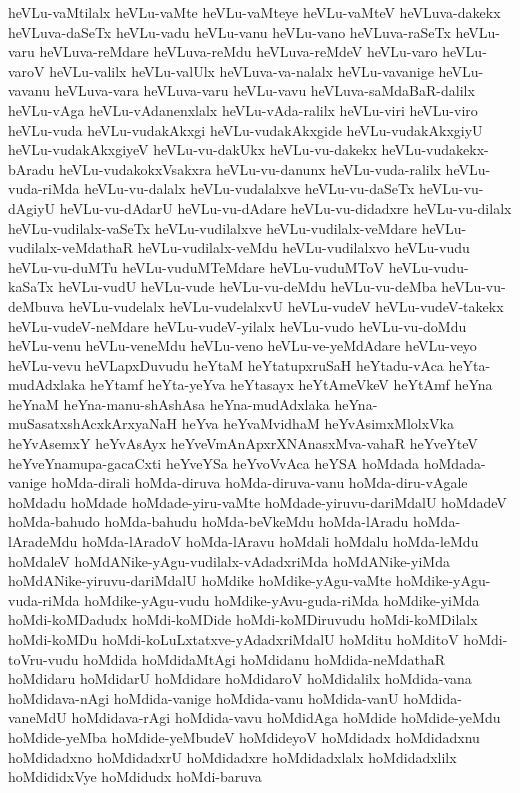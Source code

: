 {heVLu-vaMtilalx
heVLu-vaMte
heVLu-vaMteye
heVLu-vaMteV
heVLuva-dakekx
heVLuva-daSeTx
heVLu-vadu
heVLu-vanu
heVLu-vano
heVLuva-raSeTx
heVLu-varu
heVLuva-reMdare
heVLuva-reMdu
heVLuva-reMdeV
heVLu-varo
heVLu-varoV
heVLu-valilx
heVLu-valUlx
heVLuva-va-nalalx
heVLu-vavanige
heVLu-vavanu
heVLuva-vara
heVLuva-varu
heVLu-vavu
heVLuva-saMdaBaR-dalilx
heVLu-vAga
heVLu-vAdanenxlalx
heVLu-vAda-ralilx
heVLu-viri
heVLu-viro
heVLu-vuda
heVLu-vudakAkxgi
heVLu-vudakAkxgide
heVLu-vudakAkxgiyU
heVLu-vudakAkxgiyeV
heVLu-vu-dakUkx
heVLu-vu-dakekx
heVLu-vudakekx-bAradu
heVLu-vudakokxVsakxra
heVLu-vu-danunx
heVLu-vuda-ralilx
heVLu-vuda-riMda
heVLu-vu-dalalx
heVLu-vudalalxve
heVLu-vu-daSeTx
heVLu-vu-dAgiyU
heVLu-vu-dAdarU
heVLu-vu-dAdare
heVLu-vu-didadxre
heVLu-vu-dilalx
heVLu-vudilalx-vaSeTx
heVLu-vudilalxve
heVLu-vudilalx-veMdare
heVLu-vudilalx-veMdathaR
heVLu-vudilalx-veMdu
heVLu-vudilalxvo
heVLu-vudu
heVLu-vu-duMTu
heVLu-vuduMTeMdare
heVLu-vuduMToV
heVLu-vudu-kaSaTx
heVLu-vudU
heVLu-vude
heVLu-vu-deMdu
heVLu-vu-deMba
heVLu-vu-deMbuva
heVLu-vudelalx
heVLu-vudelalxvU
heVLu-vudeV
heVLu-vudeV-takekx
heVLu-vudeV-neMdare
heVLu-vudeV-yilalx
heVLu-vudo
heVLu-vu-doMdu
heVLu-venu
heVLu-veneMdu
heVLu-veno
heVLu-ve-yeMdAdare
heVLu-veyo
heVLu-vevu
heVLapxDuvudu
heYtaM
heYtatupxruSaH
heYtadu-vAca
heYta-mudAdxlaka
heYtamf
heYta-yeYva
heYtasayx
heYtAmeVkeV
heYtAmf
heYna
heYnaM
heYna-manu-shAshAsa
heYna-mudAdxlaka
heYna-muSasatxshAcxkArxyaNaH
heYva
heYvaMvidhaM
heYvAsimxMlolxVka
heYvAsemxY
heYvAsAyx
heYveVmAnApxrXNAnasxMva-vahaR
heYveYteV
heYveYnamupa-gacaCxti
heYveYSa
heYvoVvAca
heYSA
hoMdada
hoMdada-vanige
hoMda-dirali
hoMda-diruva
hoMda-diruva-vanu
hoMda-diru-vAgale
hoMdadu
hoMdade
hoMdade-yiru-vaMte
hoMdade-yiruvu-dariMdalU
hoMdadeV
hoMda-bahudo
hoMda-bahudu
hoMda-beVkeMdu
hoMda-lAradu
hoMda-lAradeMdu
hoMda-lAradoV
hoMda-lAravu
hoMdali
hoMdalu
hoMda-leMdu
hoMdaleV
hoMdANike-yAgu-vudilalx-vAdadxriMda
hoMdANike-yiMda
hoMdANike-yiruvu-dariMdalU
hoMdike
hoMdike-yAgu-vaMte
hoMdike-yAgu-vuda-riMda
hoMdike-yAgu-vudu
hoMdike-yAvu-guda-riMda
hoMdike-yiMda
hoMdi-koMDadudx
hoMdi-koMDide
hoMdi-koMDiruvudu
hoMdi-koMDilalx
hoMdi-koMDu
hoMdi-koLuLxtatxve-yAdadxriMdalU
hoMditu
hoMditoV
hoMdi-toVru-vudu
hoMdida
hoMdidaMtAgi
hoMdidanu
hoMdida-neMdathaR
hoMdidaru
hoMdidarU
hoMdidare
hoMdidaroV
hoMdidalilx
hoMdida-vana
hoMdidava-nAgi
hoMdida-vanige
hoMdida-vanu
hoMdida-vanU
hoMdida-vaneMdU
hoMdidava-rAgi
hoMdida-vavu
hoMdidAga
hoMdide
hoMdide-yeMdu
hoMdide-yeMba
hoMdide-yeMbudeV
hoMdideyoV
hoMdidadx
hoMdidadxnu
hoMdidadxno
hoMdidadxrU
hoMdidadxre
hoMdidadxlalx
hoMdidadxlilx
hoMdididxVye
hoMdidudx
hoMdi-baruva
}
